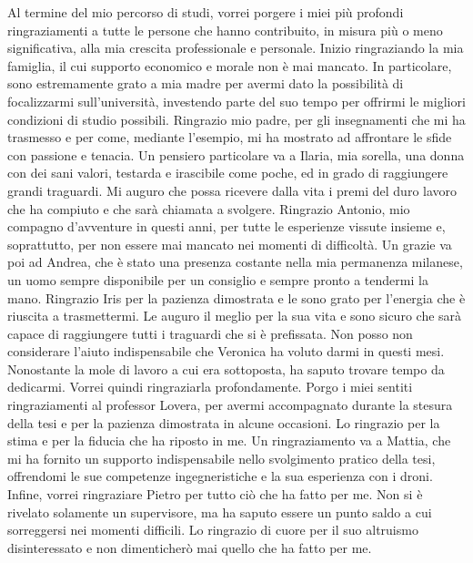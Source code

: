 
Al termine del mio percorso di studi, vorrei porgere i miei più profondi ringraziamenti
a tutte le persone che hanno contribuito, in misura più o meno significativa, alla mia
crescita professionale e personale.
Inizio ringraziando la mia famiglia, il cui supporto economico e morale non è mai mancato.
In particolare, sono estremamente grato a mia madre per avermi dato la possibilità
di focalizzarmi sull’università, investendo parte del suo tempo per offrirmi
le migliori condizioni di studio possibili.
Ringrazio mio padre, per gli insegnamenti che mi ha trasmesso e per come, mediante l’esempio,
mi ha mostrato ad affrontare le sfide con passione e tenacia.
Un pensiero particolare va a Ilaria, mia sorella, una donna con dei sani valori,
testarda e irascibile come poche, ed in grado di raggiungere grandi traguardi.
Mi auguro che possa ricevere dalla vita i premi del duro lavoro che ha compiuto e che sarà chiamata a svolgere.
Ringrazio Antonio, mio compagno d’avventure in questi anni, per tutte le
esperienze vissute insieme e, soprattutto, per non essere mai mancato nei momenti di difficoltà.
Un grazie va poi ad Andrea, che è stato una presenza costante nella mia permanenza milanese,
un uomo sempre disponibile per un consiglio e sempre pronto a tendermi la mano.
Ringrazio Iris per la pazienza dimostrata e le sono grato per l’energia che è
riuscita a trasmettermi.
Le auguro il meglio per la sua vita e sono sicuro che sarà capace di raggiungere
tutti i traguardi che si è prefissata.
Non posso non considerare l’aiuto indispensabile che Veronica ha voluto darmi in questi mesi.
Nonostante la mole di lavoro a cui era sottoposta, ha saputo trovare tempo da dedicarmi.
Vorrei quindi ringraziarla profondamente.
Porgo i miei sentiti ringraziamenti al professor Lovera, per avermi accompagnato
durante la stesura della tesi e per la pazienza dimostrata in alcune occasioni.
Lo ringrazio per la stima e per la fiducia che ha riposto in me.
Un ringraziamento va a Mattia, che mi ha fornito un supporto indispensabile
nello svolgimento pratico della tesi, offrendomi le sue competenze ingegneristiche
e la sua esperienza con i droni.
Infine, vorrei ringraziare Pietro per tutto ciò che ha fatto per me.
Non si è rivelato solamente un supervisore, ma ha saputo essere un punto saldo
a cui sorreggersi nei momenti difficili. Lo ringrazio di cuore
per il suo altruismo disinteressato e non dimenticherò mai quello che ha fatto per me. 
